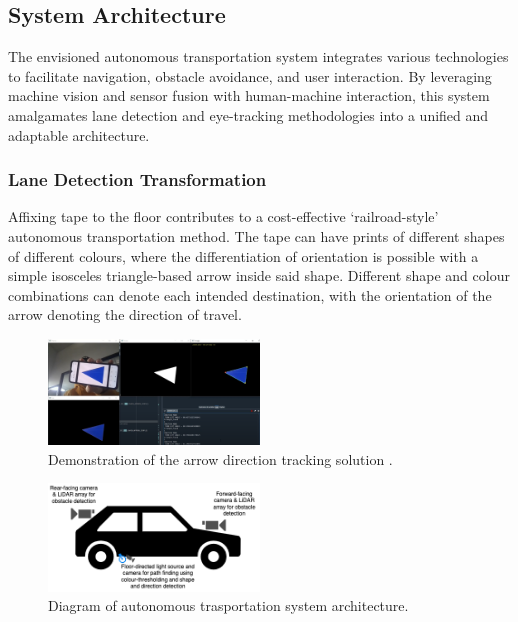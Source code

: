 \documentclass[9pt,conference]{IEEEtran}
\begin{document}
\subsection{System Architecture}

The envisioned autonomous transportation system integrates various technologies to facilitate navigation, obstacle avoidance, and user interaction. By leveraging machine vision and sensor fusion with human-machine interaction, this system amalgamates lane detection and eye-tracking methodologies into a unified and adaptable architecture.

\subsubsection{Lane Detection Transformation}

Affixing tape to the floor contributes to a cost-effective `railroad-style' autonomous transportation method. The tape can have prints of different shapes of different colours, where the differentiation of orientation is possible with a simple isosceles triangle-based arrow inside said shape. Different shape and colour combinations can denote each intended destination, with the orientation of the arrow denoting the direction of travel.

\begin{figure}[htbp]
    \centerline{\includegraphics[width=0.5\textwidth]{assets/arrow-demo.png}}
    \caption{Demonstration of the arrow direction tracking solution \cite{b29}\cite{b30}.}
    \label{f9}
\end{figure}

\begin{figure}[htbp]
    \centerline{\includegraphics[width=0.5\textwidth]{assets/car-demo.png}}
    \caption{Diagram of autonomous trasportation system architecture.}
    \label{f10}
\end{figure}
\end{document}
